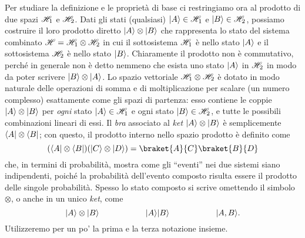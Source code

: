 Per studiare la definizione e le proprietà di base ci restringiamo ora al prodotto di due spazi $\mathscr H_1$ e $\mathscr H_2$.
Dati gli stati (qualsiasi) $\lvert A\rangle\in\mathscr H_1$ e $\lvert B\rangle\in\mathscr H_2$, possiamo costruire il loro prodotto diretto $\lvert A\rangle\otimes\lvert B\rangle$ che rappresenta lo stato del sistema combinato $\mathscr H=\mathscr H_1\otimes\mathscr H_2$ in cui il sottosistema $\mathscr H_1$ è nello stato $\lvert A\rangle$ e il sottosistema $\mathscr H_2$ è nello stato $\lvert B\rangle$.
Chiaramente il prodotto non è commutativo, perch\'e in generale non è detto nemmeno che esista uno stato $\lvert A\rangle$ in $\mathscr H_2$ in modo da poter scrivere $\lvert B\rangle\otimes\lvert A\rangle$.
Lo spazio vettoriale $\mathscr H_1\otimes\mathscr H_2$ è dotato in modo naturale delle operazioni di somma e di moltiplicazione per scalare (un numero complesso) esattamente come gli spazi di partenza: esso contiene le coppie $\lvert A\rangle\otimes\lvert B\rangle$ per \emph{ogni} stato $\lvert A\rangle\in\mathscr H_1$ e ogni stato $\lvert B\rangle\in\mathscr H_2$, e tutte le possibili combinazioni lineari di essi.
Il \textit{bra} associato al \textit{ket} $\lvert A\rangle\otimes\lvert B\rangle$ è semplicemente $\langle A\rvert\otimes\langle B\rvert$; con questo, il prodotto interno nello spazio prodotto è definito come
\begin{equation}
	(\bra{A}\otimes\bra{B})(\ket{C}\otimes\ket{D})=\braket{A}{C}\braket{B}{D}
\end{equation}
che, in termini di probabilità, mostra come gli ``eventi'' nei due sistemi siano indipendenti, poich\'e la probabilità dell'evento composto risulta essere il prodotto delle singole probabilità.
Spesso lo stato composto si scrive omettendo il simbolo $\otimes$, o anche in un unico \textit{ket}, come
\begin{equation}
	\lvert A\rangle\otimes\lvert B\rangle\hspace{2cm}\lvert A\rangle\lvert B\rangle\hspace{2cm}\lvert A,B\rangle.
\end{equation}
Utilizzeremo per un po' la prima e la terza notazione insieme.

